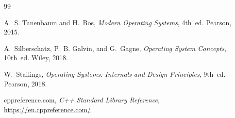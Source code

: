 \begin{thebibliography}{99}

A.~S. Tanenbaum and H.~Bos,
\textit{Modern Operating Systems}, 4th~ed.
Pearson, 2015.

A.~Silberschatz, P.~B. Galvin, and G.~Gagne,
\textit{Operating System Concepts}, 10th~ed.
Wiley, 2018.

W.~Stallings,
\textit{Operating Systems: Internals and Design Principles}, 9th~ed.
Pearson, 2018.

cppreference.com,
\textit{C++ Standard Library Reference},
\url{https://en.cppreference.com/}

\end{thebibliography}

